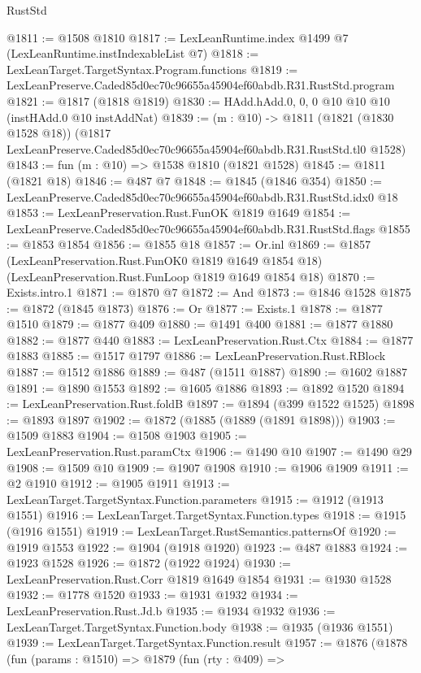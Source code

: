 \begin{lexlean}{RustStd}
\begin{coremodule}
@1811 := @1508 @1810
@1817 := LexLeanRuntime.index @1499 @7 (LexLeanRuntime.instIndexableList @7)
@1818 := LexLeanTarget.TargetSyntax.Program.functions
@1819 := LexLeanPreserve.Caded85d0ec70c96655a45904ef60abdb.R31.RustStd.program
@1821 := @1817 (@1818 @1819)
@1830 := HAdd.hAdd.{0, 0, 0} @10 @10 @10 (instHAdd.{0} @10 instAddNat)
@1839 := (m : @10) ->
  @1811
    (@1821 (@1830 @1528 @18))
    (@1817 LexLeanPreserve.Caded85d0ec70c96655a45904ef60abdb.R31.RustStd.tl0 @1528)
@1843 := fun (m : @10) => @1538 @1810 (@1821 @1528)
@1845 := @1811 (@1821 @18)
@1846 := @487 @7
@1848 := @1845 (@1846 @354)
@1850 := LexLeanPreserve.Caded85d0ec70c96655a45904ef60abdb.R31.RustStd.idx0 @18
@1853 := LexLeanPreservation.Rust.FunOK @1819 @1649
@1854 := LexLeanPreserve.Caded85d0ec70c96655a45904ef60abdb.R31.RustStd.flags
@1855 := @1853 @1854
@1856 := @1855 @18
@1857 := Or.inl
@1869 := @1857
    (LexLeanPreservation.Rust.FunOK0 @1819 @1649 @1854 @18)
    (LexLeanPreservation.Rust.FunLoop @1819 @1649 @1854 @18)
@1870 := Exists.intro.{1}
@1871 := @1870 @7
@1872 := And
@1873 := @1846 @1528
@1875 := @1872 (@1845 @1873)
@1876 := Or
@1877 := Exists.{1}
@1878 := @1877 @1510
@1879 := @1877 @409
@1880 := @1491 @400
@1881 := @1877 @1880
@1882 := @1877 @440
@1883 := LexLeanPreservation.Rust.Ctx
@1884 := @1877 @1883
@1885 := @1517 @1797
@1886 := LexLeanPreservation.Rust.RBlock
@1887 := @1512 @1886
@1889 := @487 (@1511 @1887)
@1890 := @1602 @1887
@1891 := @1890 @1553
@1892 := @1605 @1886
@1893 := @1892 @1520
@1894 := LexLeanPreservation.Rust.foldB
@1897 := @1894 (@399 @1522 @1525)
@1898 := @1893 @1897
@1902 := @1872 (@1885 (@1889 (@1891 @1898)))
@1903 := @1509 @1883
@1904 := @1508 @1903
@1905 := LexLeanPreservation.Rust.paramCtx
@1906 := @1490 @10
@1907 := @1490 @29
@1908 := @1509 @10
@1909 := @1907 @1908
@1910 := @1906 @1909
@1911 := @2 @1910
@1912 := @1905 @1911
@1913 := LexLeanTarget.TargetSyntax.Function.parameters
@1915 := @1912 (@1913 @1551)
@1916 := LexLeanTarget.TargetSyntax.Function.types
@1918 := @1915 (@1916 @1551)
@1919 := LexLeanTarget.RustSemantics.patternsOf
@1920 := @1919 @1553
@1922 := @1904 (@1918 @1920)
@1923 := @487 @1883
@1924 := @1923 @1528
@1926 := @1872 (@1922 @1924)
@1930 := LexLeanPreservation.Rust.Corr @1819 @1649 @1854
@1931 := @1930 @1528
@1932 := @1778 @1520
@1933 := @1931 @1932
@1934 := LexLeanPreservation.Rust.Jd.b
@1935 := @1934 @1932
@1936 := LexLeanTarget.TargetSyntax.Function.body
@1938 := @1935 (@1936 @1551)
@1939 := LexLeanTarget.TargetSyntax.Function.result
@1957 := @1876
    (@1878
      (fun (params : @1510) =>
      @1879
        (fun (rty : @409) =>

\end{coremodule}
\end{lexlean}

